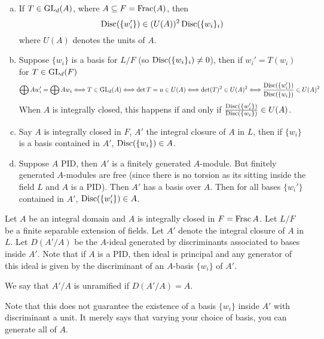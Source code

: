 \begin{cor}
\begin{enumerate}[(a)]
\item If $T \in \operatorname{GL}_d(A)$, where $A \subseteq F= \operatorname{Frac}(A)$, then 
	\[
	\operatorname{Disc}(\{w_i'\}) \in (U(A))^2 \operatorname{Disc}(\{w_i\}_i)
	\]
where $U(A)$ denotes the units of $A$.
\item Suppose $\{w_i\}$ is a basis for $L/F$ (so $\operatorname{Disc}(\{w_i\}_i) \neq 0$), then if $w_i'=T(w_i)$ for $T \in \operatorname{GL}_d(F)$
	\[
	\bigoplus Aw_i'= \bigoplus Aw_i \Longleftrightarrow T \in \operatorname{GL}_d(A) \Longleftrightarrow \det T=u \in U(A) \Longleftrightarrow \det(T)^2 \in U(A)^2 \Longleftrightarrow \dfrac{\operatorname{Disc}(\{w_i'\})}{\operatorname{Disc}(\{w_i\})} \in U(A)^2
	\]
When $A$ is integrally closed, this happens if and only if $\frac{\operatorname{Disc}(\{w_i'\})}{\operatorname{Disc}(\{w_i\})} \in U(A)$.
\item Say $A$ is integrally closed in $F$, $A'$ the integral closure of $A$ in $L$, then if $\{w_i\}$ is a basis contained in $A'$, $\operatorname{Disc}(\{w_i\}) \in A$.
\item Suppose $A$ PID, then $A'$ is a finitely generated $A$-module. But finitely generated $A$-modules are free (since there is no torsion as its sitting inside the field $L$ and $A$ is a PID). Then $A'$ has a basis over $A$. Then for all bases $\{w_i'\}$ contained in $A'$, $\operatorname{Disc}(\{w_i'\})\in A$.
\end{enumerate}
\end{cor}


\begin{dfn}
Let $A$ be an integral domain and $A$ is integrally closed in $F=\operatorname{Frac} A$. Let $L/F$ be a finite separable extension of fields. Let $A'$ denote the integral closure of $A$ in $L$. Let $D(A'/A)$ be the $A$-ideal generated by discriminants associated to bases inside $A'$. Note that if $A$ is a PID, then ideal is principal and any generator of this ideal is given by the discriminant of an $A$-basis $\{w_i\}$ of  $A'$.
\end{dfn}


\begin{dfn}[Unramified]
We say that $A'/A$ is unramified if $D(A'/A)=A$.
\end{dfn}

Note that this does not guarantee the existence of a basis $\{w_i\}$ inside $A'$ with discriminant a unit. It merely says that varying your choice of basis, you can generate all of $A$. \\


